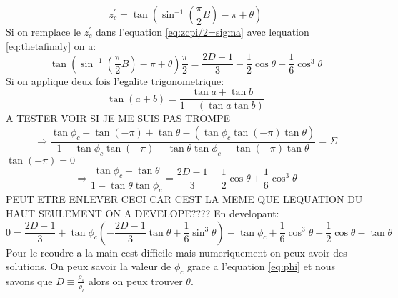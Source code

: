         \begin{equation}
            z_c^{'} = \tan\left(\sin^{-1}\left(\frac{\pi}{2}B\right)-\pi+\theta\right)
            \label{eq:thetafinaly?}
        \end{equation}
        Si on remplace le \(z_c^{'}\) dans l'equation \ref{eq:zcpi/2=sigma} avec lequation \ref{eq:thetafinaly} on a:
        \begin{equation}
            \tan\left(\sin^{-1}\left(\frac{\pi}{2}B\right)-\pi+\theta\right)\frac{\pi}{2} =\frac{2D-1}{3}-\frac{1}{2}\cos \theta + \frac{1}{6} \cos^3 \theta 
        \end{equation}
        Si on applique deux fois l'egalite trigonometrique: 
        \begin{equation}
            \tan (a+b) = \frac{\tan a + \tan b}{1-(\tan a \tan b)}
        \end{equation}
        A TESTER VOIR SI JE ME SUIS PAS TROMPE
        \begin{equation}
            \Rightarrow \frac{\tan \phi_c + \tan (-\pi) + \tan\theta - (\tan \phi_c\tan (-\pi)\tan\theta)}{1-\tan \phi_c \tan(-\pi) - \tan\theta \tan\phi_c - \tan(-\pi)\tan\theta} = \Sigma 
        \end{equation}
        \(\tan(-\pi) = 0\)
        \begin{equation}
            \Rightarrow \frac{\tan\phi_c + \tan\theta}{1-\tan\theta\tan\phi_c} = \frac{2D-1}{3}-\frac{1}{2}\cos \theta + \frac{1}{6} \cos^3 \theta
        \end{equation}
        PEUT ETRE ENLEVER CECI CAR CEST LA MEME QUE LEQUATION DU HAUT SEULEMENT ON A DEVELOPE????
        En developant:
        \begin{equation}
            0 = \frac{2D-1}{3} + \tan\phi_c(-\frac{2D-1}{3}\tan\theta + \frac{1}{6}\sin^3\theta) - \tan\phi_c+ \frac{1}{6}\cos^3\theta - \frac{1}{2}\cos\theta - \tan\theta
        \end{equation}
        Pour le reoudre a la main cest difficile mais numeriquement on peux avoir des solutions. On peux savoir la valeur de $\phi_c$ grace a l'equation \ref{eq:phi} et nous savons que \(D \equiv \frac{\rho_s}{\rho_l}\) alors on peux trouver $\theta$.


